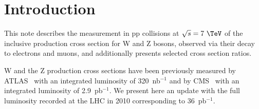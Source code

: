 \section{Introduction}
This note describes the measurement in pp collisions at
$\sqrt{s} = 7~\TeV$ of the inclusive production cross section for W
and Z bosons, observed via their decay to electrons and muons, and
additionally presents selected cross section ratios.


W and the Z production cross sections have been 
previously measured by ATLAS~\cite{WZATLAS:2010} with
an integrated luminosity of 320~nb$^{-1}$ and by 
CMS~\cite{WZCMS:2010} with an integrated luminosity of 2.9~pb$^{-1}$. 
We present here an update with the full luminosity recorded at the LHC 
in 2010 corresponding to 36~pb$^{-1}$.

%
%

